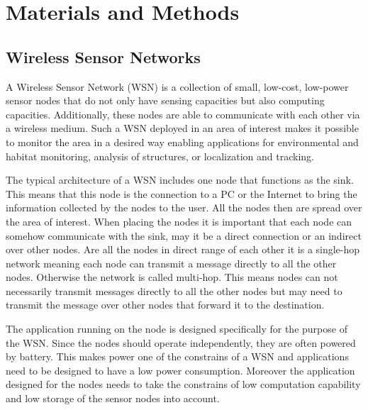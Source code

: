 \chapter{Materials and Methods}

\section{Wireless Sensor Networks}
A Wireless Sensor Network (WSN) is a collection of small, low-cost, low-power sensor nodes that do not only have sensing capacities but also computing capacities. Additionally, these nodes are able to communicate with each other via a wireless medium. Such a WSN deployed in an area of interest makes it possible to monitor the area in a desired way enabling applications for environmental and habitat monitoring, analysis of structures, or localization and tracking.

The typical architecture of a WSN includes one node that functions as the sink. This means that this node is the connection to a PC or the Internet to bring the information collected by the nodes to the user. All the nodes then are spread over the area of interest. When placing the nodes it is important that each node can somehow communicate with the sink, may it be a direct connection or an indirect over other nodes. Are all the nodes in direct range of each other it is a single-hop network meaning each node can transmit a message directly to all the other nodes. Otherwise the network is called multi-hop. This means nodes can not necessarily transmit messages directly to all the other nodes but may need to transmit the message over other nodes that forward it to the destination.

The application running on the node is designed specifically for the purpose of the WSN. Since the nodes should operate independently, they are often powered by battery. This makes power one of the constrains of a WSN and applications need to be designed to have a low power consumption. Moreover the application designed for the nodes needs to take the constrains of low computation capability and low storage of the sensor nodes into account. \cite{Wsn}\cite{Tinyos} 

	

